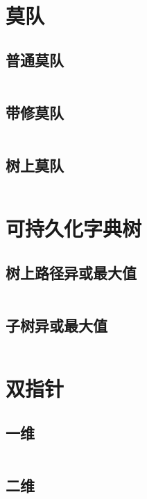 \documentclass[a4paper,11pt]{article}
\begin{document}
\section*{莫队}
\subsection*{普通莫队}
\inputminted[]{c++}{Template/Segment/bzoj2038.cpp}
\subsection*{带修莫队}
\inputminted[]{c++}{Template/Segment/bzoj2120.cpp}
\subsection*{树上莫队}
\inputminted[]{c++}{Template/Segment/luoguP4074.cpp}
\section*{可持久化字典树}
\subsection*{树上路径异或最大值}
\inputminted[]{c++}{Template/Segment/PersistibleTrieI.cpp}
\subsection*{子树异或最大值}
\inputminted[]{c++}{Template/Segment/PersistibleTrieII.cpp}

\newpage
\section*{双指针}
\subsection*{一维}
\inputminted[]{c++}{Template/Other/TwoPointer.cpp}
\subsection*{二维}
\inputminted[]{c++}{Template/Other/TwoDimTwoPointer.cpp}
\end{document}
